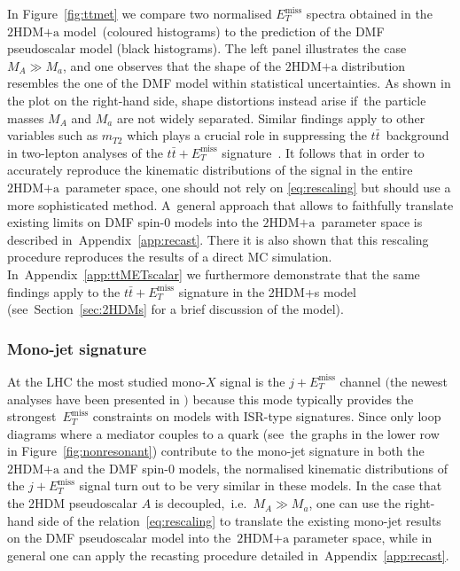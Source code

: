 \documentclass[review]{elsarticle}
\newcommand{\MET}{\ensuremath{E_T^\mathrm{miss}}\xspace}
\newcommand{\mA}{\ensuremath{M_{A}}\xspace}
\newcommand{\ma}{\ensuremath{M_{a}}\xspace}
\newcommand{\hdma}{\ensuremath{\textrm{2HDM+a}}\xspace}
\begin{document}
In Figure~\ref{fig:ttmet} we compare two normalised $\MET$ spectra obtained in the \hdma model~(coloured histograms) to the prediction of the DMF pseudoscalar   model (black histograms).  The left panel illustrates the case~$M_A \gg M_a$, and one observes that the shape of the \hdma distribution resembles  the one of the DMF model within statistical uncertainties. As shown in the plot on the right-hand side, shape distortions instead arise if~the particle masses $M_A$ and $M_a$ are not widely separated.  Similar findings apply to other variables such as $m_{T2}$ which  plays a crucial role in suppressing the $t \bar t$~background in two-lepton analyses of the $t \bar t + \MET$ signature~\cite{Aaboud:2017rzf,Haisch:2016gry,CMS-PAS-EXO-17-014}. It follows that in order to accurately reproduce the kinematic distributions of the signal in the entire \hdma~parameter space, one should not rely on \eqref{eq:rescaling} but should use a more sophisticated method. A~general approach  that allows to faithfully translate existing limits on DMF spin-0   models into the \hdma~parameter space  is described in~Appendix~\ref{app:recast}. There it is also shown that this rescaling procedure reproduces the results of a direct MC simulation.  In~Appendix~\ref{app:ttMETscalar} we furthermore demonstrate that the same findings apply to the $t \bar t + \MET$ signature in the 2HDM+s model  (see~Section~\ref{sec:2HDMs} for a brief discussion of the model).

\subsubsection{Mono-jet signature}

At the LHC the most studied mono-$X$ signal is the $j +\MET$ channel $\big($the newest analyses have been presented in \cite{Aaboud:2017phn,Sirunyan:2017jix}$\big)$ because this mode typically provides the strongest~$\MET$ constraints on models with ISR-type  signatures. Since only loop diagrams where a mediator couples to a quark (see~the graphs in the lower row in Figure~\ref{fig:nonresonant}) contribute to the mono-jet signature in both the \hdma and the DMF spin-0 models, the normalised kinematic distributions of the $j +\MET$ signal turn out to be very similar in these models.  In the case that the 2HDM pseudoscalar $A$ is decoupled,~i.e.~$\mA \gg \ma$, one can use the right-hand side of the relation~\eqref{eq:rescaling} to translate the existing mono-jet results on the DMF pseudoscalar model into the~\hdma parameter space, while in general one can apply the recasting procedure detailed in~Appendix~\ref{app:recast}.
\end{document}
